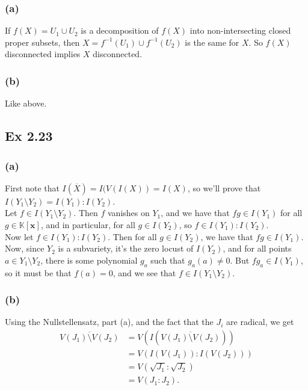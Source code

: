 \documentclass{article}
\theoremstyle{definition}
\newcommand{\K}{\mathbb{K}}
\newcommand{\Kx}{\K[\bm{x}]}
\begin{document}
\subsubsection*{(a)}

If $f(X) = U_1 \cup U_2$ is a decomposition of $f(X)$ into non-intersecting
closed proper subsets, then $X = f^{-1}(U_1) \cup f^{-1}(U_2)$ is the same for
$X$. So $f(X)$ disconnected implies $X$ disconnected.

\subsubsection*{(b)}

Like above.

\subsection*{Ex 2.23}

\subsubsection*{(a)}

First note that $I(\overline{X}) = I(V(I(X)) = I(X)$, so
we'll prove that $I(Y_1 \setminus Y_2) = I(Y_1) : I(Y_2)$. \\

Let $f \in I(Y_1 \setminus Y_2)$. Then $f$ vanishes on $Y_1$, and we have that 
$f g \in I(Y_1)$ for all $g \in \Kx$, and in particular, for all $g \in I(Y_2)$,
so $f \in I(Y_1) : I(Y_2)$. \\

Now let $f \in I(Y_1) : I(Y_2)$. Then for all $g \in I(Y_2)$, we have that $fg
\in I(Y_1)$. Now, since $Y_2$ is a subvariety, it's the zero locust of
$I(Y_2)$, and for all points $a \in Y_1 \setminus Y_2$, there is some
polynomial $g_a$ such that $g_a(a) \not = 0$. But $fg_{a} \in I(Y_1)$, so it
must be that $f(a) = 0$, and we see that $f \in I(Y_1 \setminus Y_2)$.

\subsubsection*{(b)}
Using the Nullstellensatz, part (a), and the fact that the $J_i$ are radical,
we get
\begin{align*}
	\overline{V(J_1) \setminus V(J_2)}
	&= V(I(\overline{V(J_1) \setminus V(J_2)})) \\
	&= V(I(V(J_1)) : I(V(J_2))) \\
	&= V(\sqrt{J_1} : \sqrt{J_2}) \\
	&= V(J_1 : J_2).
\end{align*}
\end{document}
